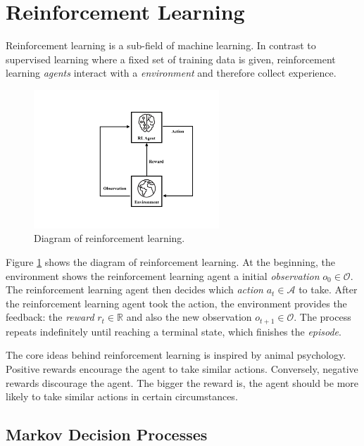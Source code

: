 \section{Reinforcement Learning}

    Reinforcement learning is a sub-field of machine learning.
    In contrast to supervised learning where a fixed set of training data is given,
    reinforcement learning \emph{agents} interact with a \emph{environment} and therefore collect experience.

    \begin{figure}[!htp]
        \centering
        \includegraphics[width=0.62\textwidth]{img/rl.pdf}
        \caption{Diagram of reinforcement learning.}
        \label{fig:rl}
    \end{figure}

    Figure \ref{fig:rl} shows the diagram of reinforcement learning.
    At the beginning, the environment shows the reinforcement learning agent
    a initial \emph{observation} $o_0 \in \mathcal{O}$.
    The reinforcement learning agent then decides which \emph{action} $a_t \in \mathcal{A}$ to take.
    After the reinforcement learning agent took the action,
    the environment provides the feedback: the \emph{reward} $r_t \in \mathbb{R}$
    and also the new observation $o_{t+1} \in \mathcal{O}$.
    The process repeats indefinitely until reaching a terminal state,
    which finishes the \emph{episode}.

    The core ideas behind reinforcement learning is inspired by animal psychology.
    Positive rewards encourage the agent to take similar actions.
    Conversely, negative rewards discourage the agent.
    The bigger the reward is, the agent should be more likely to take similar actions in certain circumstances.

    \subsection{Markov Decision Processes}

